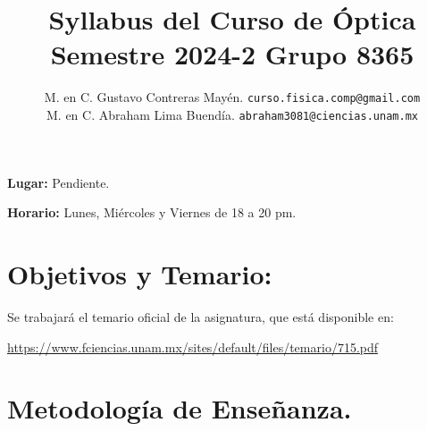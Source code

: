 

\author{M. en C. Gustavo Contreras Mayén. \texttt{curso.fisica.comp@gmail.com}\\
M. en C. Abraham Lima Buendía. \texttt{abraham3081@ciencias.unam.mx}}
\title{Syllabus del Curso de Óptica \\ {\large Semestre 2024-2 Grupo 8365}}
\date{ }

\usepackage[backend=biber, style=ieee, sorting=ynt]{biblatex}





\renewcommand\labelenumii{\theenumi.{\arabic{enumii}}}
\maketitle
\fontsize{12}{12}\selectfont

\textbf{Lugar: } Pendiente.
\par
\textbf{Horario: } Lunes, Miércoles y Viernes de 18 a 20 pm.
\par
\par
\section{Objetivos y Temario:}

Se trabajará el temario oficial de la asignatura, que está disponible en:

\href{https://www.fciencias.unam.mx/sites/default/files/temario/715.pdf}{https://www.fciencias.unam.mx/sites/default/files/temario/715.pdf}

\section{Metodología de Enseñanza.}

